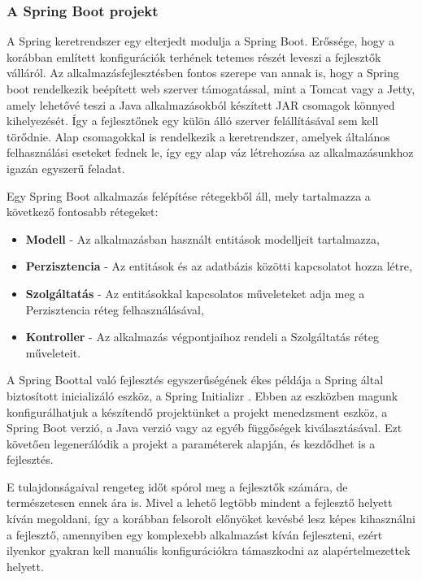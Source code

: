 \documentclass[12pt]{article}
\begin{document}
\subsubsection{A Spring Boot projekt}

A Spring keretrendszer egy elterjedt modulja a Spring Boot. Erőssége, hogy a korábban említett konfigurációk terhének tetemes részét leveszi a fejlesztők válláról. Az alkalmazásfejlesztésben fontos szerepe van annak is, hogy a Spring boot rendelkezik beépített web szerver támogatással, mint a Tomcat vagy a Jetty, amely lehetővé teszi a Java alkalmazásokból készített JAR csomagok könnyed kihelyezését. Így a fejlesztőnek egy külön álló szerver felállításával sem kell törődnie. Alap csomagokkal is rendelkezik a keretrendszer, amelyek általános felhasználási eseteket fednek le, így egy alap váz létrehozása az alkalmazásunkhoz igazán egyszerű feladat.

Egy Spring Boot alkalmazás felépítése rétegekből áll, mely tartalmazza a következő fontosabb rétegeket:
\begin{itemize}
	\item[]\textbf{Modell}
	- Az alkalmazásban használt entitások modelljeit tartalmazza,
	\item[]\textbf{Perzisztencia}
	- Az entitások és az adatbázis közötti kapcsolatot hozza létre,
	\item[]\textbf{Szolgáltatás}
	- Az entitásokkal kapcsolatos műveleteket adja meg a Perzisztencia réteg felhasználásával,
	\item[]\textbf{Kontroller}
	- Az alkalmazás végpontjaihoz rendeli a Szolgáltatás réteg műveleteit.
\end{itemize}

A Spring Boottal való fejlesztés egyszerűségének ékes példája a Spring által biztosított inicializáló eszköz, a Spring Initializr \cite{SPRING_INIT}. Ebben az eszközben magunk konfigurálhatjuk a készítendő projektünket a projekt menedzsment eszköz, a Spring Boot verzió, a Java verzió vagy az egyéb függőségek kiválasztásával. Ezt követően legenerálódik a projekt a paraméterek alapján, és kezdődhet is a fejlesztés.

E tulajdonságaival rengeteg időt spórol meg a fejlesztők számára, de természetesen ennek ára is. Mivel a lehető legtöbb mindent a fejlesztő helyett kíván megoldani, így a korábban felsorolt előnyöket kevésbé lesz képes kihasználni a fejlesztő, amennyiben egy komplexebb alkalmazást kíván fejleszteni, ezért ilyenkor gyakran kell manuális konfigurációkra támaszkodni az alapértelmezettek helyett.
\end{document}
